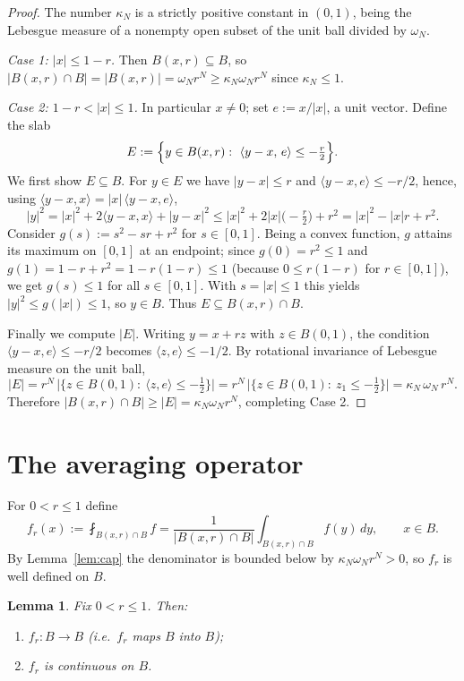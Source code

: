 \documentclass{amsart}
\newtheorem{lemma}{Lemma}
\theoremstyle{definition}
\begin{document}
\begin{proof}
The number $\kappa_N$ is a strictly positive constant in $(0,1)$, being the
Lebesgue measure of a nonempty open subset of the unit ball divided by $\omega_N$.

\emph{Case 1: $|x|\le 1-r$.} Then $B(x,r)\subseteq B$, so
$|B(x,r)\cap B|=|B(x,r)|=\omega_N r^N\ge\kappa_N\omega_N r^N$ since $\kappa_N\le1$.

\emph{Case 2: $1-r<|x|\le 1$.} In particular $x\ne0$; set $e:=x/|x|$, a unit
vector. Define the slab
\[
E:=\Bigl\{y\in B(x,r):\ \langle y-x,\,e\rangle\le -\tfrac{r}{2}\Bigr\}.
\]
We first show $E\subseteq B$. For $y\in E$ we have $|y-x|\le r$ and
$\langle y-x,e\rangle\le -r/2$, hence, using $\langle y-x,x\rangle=|x|\,\langle
y-x,e\rangle$,
\[
|y|^2=|x|^2+2\langle y-x,x\rangle+|y-x|^2
\le |x|^2+2|x|\bigl(-\tfrac r2\bigr)+r^2
=|x|^2-|x|r+r^2 .
\]
Consider $g(s):=s^2-sr+r^2$ for $s\in[0,1]$. Being a convex function, $g$ attains
its maximum on $[0,1]$ at an endpoint; since $g(0)=r^2\le1$ and
$g(1)=1-r+r^2=1-r(1-r)\le1$ (because $0\le r(1-r)$ for $r\in[0,1]$), we get
$g(s)\le1$ for all $s\in[0,1]$. With $s=|x|\le1$ this yields $|y|^2\le g(|x|)\le1$,
so $y\in B$. Thus $E\subseteq B(x,r)\cap B$.

Finally we compute $|E|$. Writing $y=x+rz$ with $z\in B(0,1)$, the condition
$\langle y-x,e\rangle\le -r/2$ becomes $\langle z,e\rangle\le -1/2$. By rotational
invariance of Lebesgue measure on the unit ball,
\[
|E|=r^N\,\bigl|\{z\in B(0,1):\ \langle z,e\rangle\le -\tfrac12\}\bigr|
   =r^N\,\bigl|\{z\in B(0,1):\ z_1\le -\tfrac12\}\bigr|
   =\kappa_N\,\omega_N\,r^N .
\]
Therefore $|B(x,r)\cap B|\ge|E|=\kappa_N\omega_N r^N$, completing Case 2.
\end{proof}

\section{The averaging operator}

For $0<r\le1$ define
\begin{equation}\label{eq:fr}
f_r(x):=\fint_{B(x,r)\cap B} f
       =\frac{1}{|B(x,r)\cap B|}\int_{B(x,r)\cap B}f(y)\,dy,\qquad x\in B.
\end{equation}
By Lemma~\ref{lem:cap} the denominator is bounded below by $\kappa_N\omega_N r^N>0$,
so $f_r$ is well defined on $B$.

\begin{lemma}\label{lem:basic}
Fix $0<r\le1$. Then:
\begin{enumerate}
\item[(a)] $f_r:B\to B$ (i.e.\ $f_r$ maps $B$ into $B$);
\item[(b)] $f_r$ is continuous on $B$.
\end{enumerate}
\end{lemma}
\end{document}
